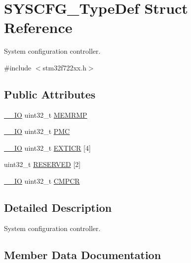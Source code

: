 \hypertarget{struct_s_y_s_c_f_g___type_def}{}\section{S\+Y\+S\+C\+F\+G\+\_\+\+Type\+Def Struct Reference}
\label{struct_s_y_s_c_f_g___type_def}


System configuration controller.  




{\ttfamily \#include $<$stm32f722xx.\+h$>$}

\subsection*{Public Attributes}
\begin{DoxyCompactItemize}
\item 
\mbox{\hyperlink{core__sc300_8h_aec43007d9998a0a0e01faede4133d6be}{\+\_\+\+\_\+\+IO}} uint32\+\_\+t \mbox{\hyperlink{struct_s_y_s_c_f_g___type_def_a85b9d3df2274b730327b181c402a7bf5}{M\+E\+M\+R\+MP}}
\item 
\mbox{\hyperlink{core__sc300_8h_aec43007d9998a0a0e01faede4133d6be}{\+\_\+\+\_\+\+IO}} uint32\+\_\+t \mbox{\hyperlink{struct_s_y_s_c_f_g___type_def_ab5c47c570566cb8ff9d0436c17cc9241}{P\+MC}}
\item 
\mbox{\hyperlink{core__sc300_8h_aec43007d9998a0a0e01faede4133d6be}{\+\_\+\+\_\+\+IO}} uint32\+\_\+t \mbox{\hyperlink{struct_s_y_s_c_f_g___type_def_a66a06b3aab7ff5c8fa342f7c1994bf7d}{E\+X\+T\+I\+CR}} \mbox{[}4\mbox{]}
\item 
uint32\+\_\+t \mbox{\hyperlink{struct_s_y_s_c_f_g___type_def_a43926e6d31a976a0018b2d1f5c92645d}{R\+E\+S\+E\+R\+V\+ED}} \mbox{[}2\mbox{]}
\item 
\mbox{\hyperlink{core__sc300_8h_aec43007d9998a0a0e01faede4133d6be}{\+\_\+\+\_\+\+IO}} uint32\+\_\+t \mbox{\hyperlink{struct_s_y_s_c_f_g___type_def_ada13497abc6402300570ff5f430a612e}{C\+M\+P\+CR}}
\end{DoxyCompactItemize}


\subsection{Detailed Description}
System configuration controller. 

\subsection{Member Data Documentation}
\mbox{\label{struct_s_y_s_c_f_g___type_def_ada13497abc6402300570ff5f430a612e}} 
